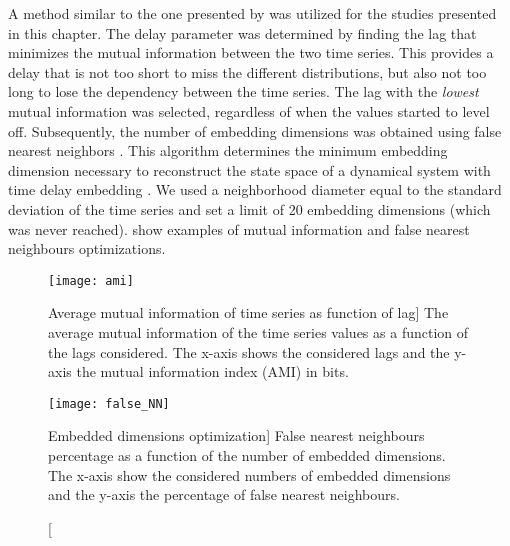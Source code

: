 A method similar to the one presented by \citet{Marwan2007recurrence} was utilized for the studies presented in this chapter.
The delay parameter was determined by finding the lag that minimizes the mutual information between the two time series.
This provides a delay that is not too short to miss the different distributions, but also not too long to lose the dependency between the time series.
The lag with the \emph{lowest} mutual information was selected, regardless of when the values started to level off.
Subsequently, the number of embedding dimensions was obtained using false nearest neighbors \citep{Kennel1992determining}.
This algorithm determines the minimum embedding dimension necessary to reconstruct the state space of a dynamical system with time delay embedding \citep{Abarbanel1993local}.
We used a neighborhood diameter equal to the standard deviation of the time series and set a limit of 20 embedding dimensions (which was never reached).
 show examples of mutual information and false nearest neighbours optimizations.

\begin{figure}[H]
	\centering
	\begin{minipage}{.45\linewidth}
		\centering
		\texttt{[image: ami]}
		\caption
		[Average mutual information of time series as function of lag]
		{The average mutual information of the time series values as a function of the lags considered.
		The x-axis shows the considered lags and the y-axis the mutual information index (AMI) in bits.}
		\label{fig:ami}
	\end{minipage}%
	\hfill
	\begin{minipage}{.45\linewidth}
		\centering
		\texttt{[image: false\_NN]}
		\caption
		[Embedded dimensions optimization]
		{False nearest neighbours percentage as a function of the number of embedded dimensions.
		The x-axis show the considered numbers of embedded dimensions and the y-axis the percentage of false nearest neighbours.}
		\label{fig:false_nn}
	\end{minipage}	
\end{figure}

